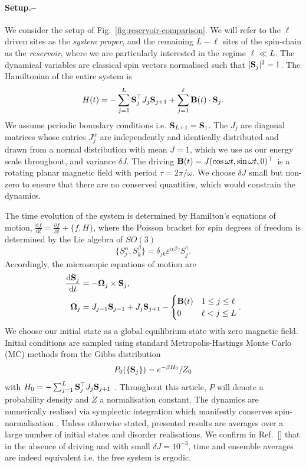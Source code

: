 \documentclass[prl,aps,twocolumn,notitlepage,10pt]{revtex4-1}
\def\d{\mathrm{d}}
\newcommand{\be}{\begin{equation}}
\newcommand{\ee}{\end{equation}}
\newcommand{\beA}{\begin{equation}\begin{aligned}}
\newcommand{\eeA}{\end{aligned}\end{equation}}
\begin{document}
\paragraph{Setup.--}\label{sec:system}
We consider the setup of Fig.~\ref{fig:reservoir-comparison}.
We will refer to the $\ell$ driven sites as the \emph{system proper}, and the
remaining $L-\ell$ sites of the spin-chain as the \emph{reservoir}, where we
are particularly interested in the regime $\ell \ll L$.
The dynamical variables are classical spin vectors normalised such that $|{\bf
  S}_j|^2 = 1$.
The Hamiltonian of the entire system is
\be
H(t) = - \sum_{j=1}^L {\bf S}_j^\top J_j {\bf S}_{j+1} + \sum_{j=1}^\ell {\bf B}(t) \cdot {\bf S}_j.
\label{eq:H}
\ee
We assume periodic boundary conditions i.e.  ${\bf S}_{L+1} = {\bf S}_1$.
The $J_j$ are diagonal matrices whose entries $J_j^\alpha$ are independently
and identically distributed and drawn from a normal distribution with mean
$J=1$, which we use as our energy scale throughout, and variance $\delta J$.
The driving ${\bf B}(t) = J(\cos \omega t, \sin \omega t,
  0)^\top$ is a rotating planar magnetic field with period $\tau = 2\pi /
  \omega$.
We choose $\delta J$ small but non-zero to ensure that there are no conserved
quantities, which would constrain the dynamics.

The time evolution of the system is determined by Hamilton's equations of
motion, $\frac{\d f}{\d t} = \frac{\partial f}{\partial t} + \{ f, H\}$, where
the Poisson bracket for spin degrees of freedom is determined by the Lie
algebra of $SO(3)$
\be
\{ S_j^\alpha, S_k^\beta \} = \delta_{jk} \varepsilon^{\alpha\beta\gamma} S_j^\gamma.
\ee
Accordingly, the microscopic equations of motion are
\beA
\frac{\d {\bf S}_j }{\d t}
& = -{\boldsymbol\Omega}_j \times {\bf S}_j , \\
{\boldsymbol\Omega}_j &=
J_{j-1} {\bf S}_{j-1}
+
J_j {\bf S}_{j+1}
-
\begin{cases} {\bf B}(t) & 1\leq j \leq \ell \\
  0          & \ell < j \leq L\end{cases}
.
\eeA
We choose our initial state as a global equilibrium state with zero magnetic
field.
Initial conditions are sampled using standard Metropolis-Hastings
Monte Carlo (MC) methods from the Gibbs distribution
\be
P_0(\{ {\bf S}_j \} ) =
e^{-\beta H_0}/Z_0
\label{eq:P0}
\ee
with $H_0=- \sum_{j=1}^L {\bf S}_j^\top J_j {\bf S}_{j+1}$
\cite{Newman-Barkema}.
Throughout this article, $P$ will denote a probability density and $Z$ a
normalisation constant.
The dynamics are numerically realised via symplectic
integration which manifestly conserves
spin-normalisation \cite{Krech-Bunker-Landau}.
Unless otherwise stated, presented results are averages over a large number of
initial states and disorder realisations.
We confirm in Ref.~[] that in the absence of driving and
with small $\delta J =10^{-3}$, time and ensemble averages are indeed equivalent
i.e. the free system is ergodic.
\end{document}
